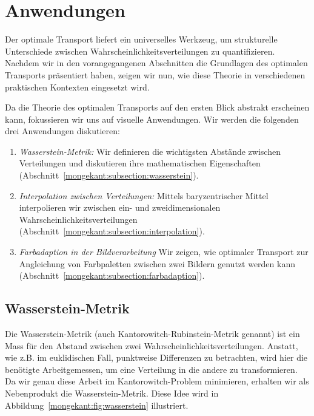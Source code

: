 %
%
%
%
\section{Anwendungen%
\label{mongekant:section:teil3}}

Der optimale Transport liefert ein universelles Werkzeug,
um strukturelle Unterschiede zwischen Wahrscheinlichkeitsverteilungen zu quantifizieren.
Nachdem wir in den vorangegangenen Abschnitten
die Grundlagen des optimalen Transports präsentiert haben,
zeigen wir nun,
wie diese Theorie in verschiedenen praktischen Kontexten eingesetzt wird.

Da die Theorie des optimalen Transports auf den ersten Blick abstrakt erscheinen kann,
fokussieren wir uns auf visuelle Anwendungen.
Wir werden die folgenden drei Anwendungen diskutieren:
\begin{enumerate}
\item \emph{Wasserstein-Metrik:}
Wir definieren die wichtigsten Abstände zwischen Verteilungen und
diskutieren ihre mathematischen Eigenschaften
(Abschnitt~\ref{mongekant:subsection:wasserstein}).
\item \emph{Interpolation zwischen Verteilungen:}
Mittels baryzentrischer Mittel interpolieren
wir zwischen ein- und zweidimensionalen Wahrscheinlichkeitsverteilungen
(Abschnitt~\ref{mongekant:subsection:interpolation}).
\item \emph{Farbadaption in der Bildverarbeitung}
Wir zeigen,
wie optimaler Transport zur Angleichung von Farbpaletten
zwischen zwei Bildern genutzt werden kann
(Abschnitt~\ref{mongekant:subsection:farbadaption}).
\end{enumerate}

\subsection{Wasserstein-Metrik%
\label{mongekant:subsection:wasserstein}}

Die Wasserstein-Metrik (auch Kantorowitch-Rubinstein-Metrik genannt)
ist ein Mass für den Abstand zwischen zwei Wahrscheinlichkeitsverteilungen.
Anstatt,
wie z.B. im euklidischen Fall,
punktweise Differenzen zu betrachten,
wird hier die benötigte \glqq Arbeit\grqq gemessen,
um eine Verteilung in die andere zu transformieren.
Da wir genau diese Arbeit im Kantorowitch-Problem minimieren,
erhalten wir als Nebenprodukt die Wasserstein-Metrik.
Diese Idee wird in Abbildung~\ref{mongekant:fig:wasserstein} illustriert.

